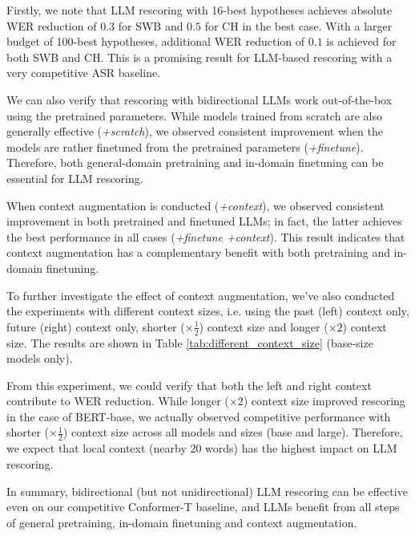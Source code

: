 \documentclass[a4paper]{article}
\newcommand{\textapprox}{\raisebox{0.5ex}{\texttildelow}}
\begin{document}
Firstly, we note that LLM rescoring with 16-best hypotheses achieves absolute WER reduction of $0.3$ for SWB and $0.5$ for CH in the best case. With a larger budget of 100-best hypotheses, additional WER reduction of $0.1$ is achieved for both SWB and CH. This is a promising result for LLM-based rescoring with a very competitive ASR baseline.

We can also verify that rescoring with bidirectional LLMs work out-of-the-box using the pretrained parameters. While models trained from scratch are also generally effective (\textit{+scratch}), we observed consistent improvement when the models are rather finetuned from the pretrained parameters (\textit{+finetune}). Therefore, both general-domain pretraining and in-domain finetuning can be essential for LLM rescoring.

When context augmentation is conducted (\textit{+context}), we observed consistent improvement in both pretrained and finetuned LLMs; in fact, the latter achieves the best performance in all cases (\textit{+finetune} \textit{+context}). This result indicates that context augmentation has a complementary benefit with both pretraining and in-domain finetuning.

To further investigate the effect of context augmentation, we've also conducted the experiments with different context sizes, i.e. using the past (left) context only, future (right) context only, shorter ($\times \frac{1}{2}$) context size and longer ($\times 2$) context size. The results are shown in Table \ref{tab:different_context_size} (base-size models only).

From this experiment, we could verify that both the left and right context contribute to WER reduction. While longer ($\times 2$) context size improved rescoring in the case of BERT-base, we actually observed competitive performance with shorter ($\times \frac{1}{2}$) context size across all models and sizes (base and large). Therefore, we expect that local context (nearby \textapprox 20 words) has the highest impact on LLM rescoring.


In summary, bidirectional (but not unidirectional) LLM rescoring can be effective even on our competitive Conformer-T baseline, and LLMs benefit from all steps of general pretraining, in-domain finetuning and context augmentation.
\end{document}
